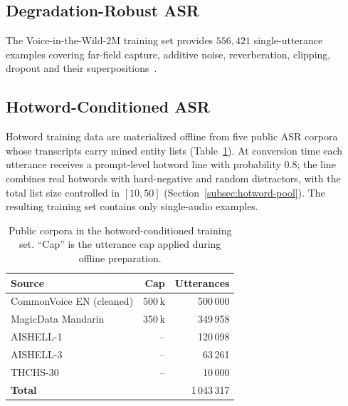 \subsection{Degradation-Robust ASR}
\label{subsec:vitw-data}

The Voice-in-the-Wild-2M training set provides $556{,}421$
single-utterance examples covering far-field capture, additive noise,
reverberation, clipping, dropout and their superpositions~\cite{xie2026mega}.

\subsection{Hotword-Conditioned ASR}
\label{subsec:hotword-sources}

Hotword training data are materialized offline from five public
ASR corpora whose transcripts carry mined entity lists
(Table~\ref{tab:data_hw_train}).
At conversion time each utterance receives a prompt-level hotword line
with probability $0.8$; the line combines real hotwords with
hard-negative and random distractors, with the total list size
controlled in $[10, 50]$ (Section~\ref{subsec:hotword-pool}).
The resulting training set contains only single-audio examples.

\begin{table}[t]
  \caption{Public corpora in the hotword-conditioned training set.
    ``Cap'' is the utterance cap applied during offline preparation.}
  \label{tab:data_hw_train}
  \centering
  \small
  \begin{tabular}{lrr}
    \toprule
    Source & Cap & Utterances \\
    \midrule
    CommonVoice EN (cleaned) \cite{ardila2020commonvoice} & 500\,k & 500\,000 \\
    MagicData Mandarin \cite{magicdata}                     & 350\,k & 349\,958 \\
    AISHELL-1 \cite{bu2017aishell}                            & --     & 120\,098 \\
    AISHELL-3 \cite{shi2021aishell3}                          & --     & 63\,261 \\
    THCHS-30 \cite{wang2015thchs30}                            & --     & 10\,000 \\
    \midrule
    \textbf{Total}                                            &        & 1\,043\,317 \\
    \bottomrule
  \end{tabular}
\end{table}


